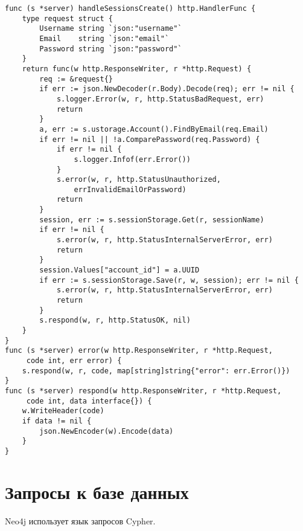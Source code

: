 \begin{lstlisting}[label=lst:sessions,caption=Маршрутизация запроса аутентификации]
func (s *server) handleSessionsCreate() http.HandlerFunc {
	type request struct {
		Username string `json:"username"`
		Email    string `json:"email"`
		Password string `json:"password"`
	}
	return func(w http.ResponseWriter, r *http.Request) {
		req := &request{}
		if err := json.NewDecoder(r.Body).Decode(req); err != nil {
			s.logger.Error(w, r, http.StatusBadRequest, err)
			return
		}
		a, err := s.ustorage.Account().FindByEmail(req.Email)
		if err != nil || !a.ComparePassword(req.Password) {
			if err != nil {
				s.logger.Infof(err.Error())
			}
			s.error(w, r, http.StatusUnauthorized, 
				errInvalidEmailOrPassword)
			return
		}
		session, err := s.sessionStorage.Get(r, sessionName)
		if err != nil {
			s.error(w, r, http.StatusInternalServerError, err)
			return
		}
		session.Values["account_id"] = a.UUID
		if err := s.sessionStorage.Save(r, w, session); err != nil {
			s.error(w, r, http.StatusInternalServerError, err)
			return
		}
		s.respond(w, r, http.StatusOK, nil)
	}
}
func (s *server) error(w http.ResponseWriter, r *http.Request,
	 code int, err error) {
	s.respond(w, r, code, map[string]string{"error": err.Error()})
}
func (s *server) respond(w http.ResponseWriter, r *http.Request,
	 code int, data interface{}) {
	w.WriteHeader(code)
	if data != nil {
		json.NewEncoder(w).Encode(data)
	}
}
\end{lstlisting}

\section{Запросы к базе данных}
Neo4j использует язык запросов Cypher\cite{cypher}. 

